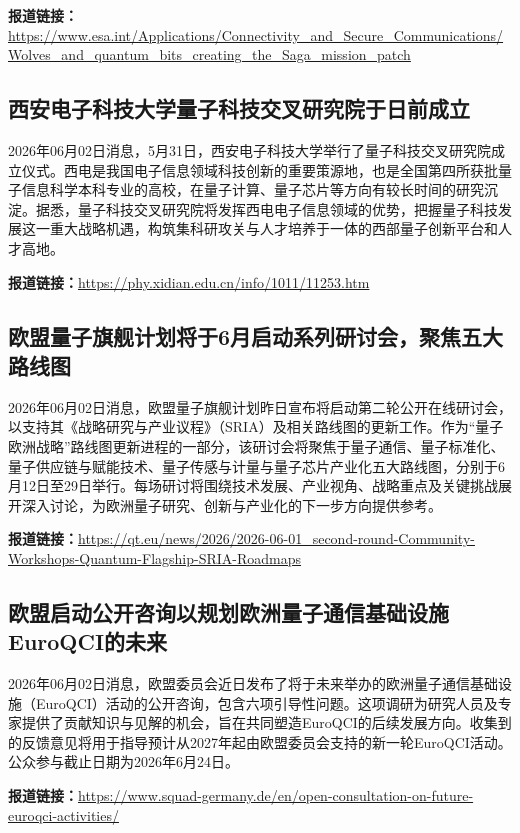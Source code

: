 \documentclass[12pt,a4paper]{ctexart}
\begin{document}
\noindent\textbf{报道链接：}\url{https://www.esa.int/Applications/Connectivity\_and\_Secure\_Communications/Wolves\_and\_quantum\_bits\_creating\_the\_Saga\_mission\_patch}

\subsection{ 西安电子科技大学量子科技交叉研究院于日前成立 }

2026年06月02日消息，5月31日，西安电子科技大学举行了量子科技交叉研究院成立仪式。西电是我国电子信息领域科技创新的重要策源地，也是全国第四所获批量子信息科学本科专业的高校，在量子计算、量子芯片等方向有较长时间的研究沉淀。据悉，量子科技交叉研究院将发挥西电电子信息领域的优势，把握量子科技发展这一重大战略机遇，构筑集科研攻关与人才培养于一体的西部量子创新平台和人才高地。

\noindent\textbf{报道链接：}\url{https://phy.xidian.edu.cn/info/1011/11253.htm}

\subsection{ 欧盟量子旗舰计划将于6月启动系列研讨会，聚焦五大路线图 }

2026年06月02日消息，欧盟量子旗舰计划昨日宣布将启动第二轮公开在线研讨会，以支持其《战略研究与产业议程》（SRIA）及相关路线图的更新工作。作为“量子欧洲战略”路线图更新进程的一部分，该研讨会将聚焦于量子通信、量子标准化、量子供应链与赋能技术、量子传感与计量与量子芯片产业化五大路线图，分别于6月12日至29日举行。每场研讨将围绕技术发展、产业视角、战略重点及关键挑战展开深入讨论，为欧洲量子研究、创新与产业化的下一步方向提供参考。

\noindent\textbf{报道链接：}\url{https://qt.eu/news/2026/2026-06-01\_second-round-Community-Workshops-Quantum-Flagship-SRIA-Roadmaps}

\subsection{ 欧盟启动公开咨询以规划欧洲量子通信基础设施EuroQCI的未来 }

2026年06月02日消息，欧盟委员会近日发布了将于未来举办的欧洲量子通信基础设施（EuroQCI）活动的公开咨询，包含六项引导性问题。这项调研为研究人员及专家提供了贡献知识与见解的机会，旨在共同塑造EuroQCI的后续发展方向。收集到的反馈意见将用于指导预计从2027年起由欧盟委员会支持的新一轮EuroQCI活动。公众参与截止日期为2026年6月24日。

\noindent\textbf{报道链接：}\url{https://www.squad-germany.de/en/open-consultation-on-future-euroqci-activities/}
\end{document}

